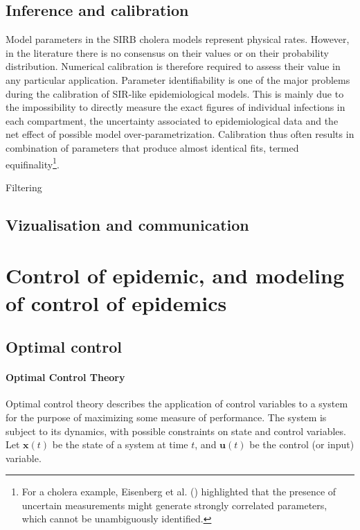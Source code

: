 \subsection{Inference and calibration} 
Model parameters in the SIRB cholera models represent physical rates. However, in the literature there is no consensus on their values or on their  probability distribution. Numerical calibration is therefore required to assess their value in any particular application. Parameter identifiability is one of the major problems during the calibration of SIR-like epidemiological models. This is mainly due to the impossibility to directly measure the exact figures of individual infections in each compartment, the uncertainty associated to epidemiological data and the net effect of possible model over-parametrization. Calibration thus often results in combination of parameters that produce almost identical fits, termed equifinality\footnote{For a cholera example, Eisenberg et al. () highlighted that the presence of uncertain measurements might generate strongly correlated parameters, which cannot be unambiguously  identified.}.



 Filtering
\subsection{Vizualisation and communication}


 \section{Control of epidemic, and modeling of control of epidemics}%

\subsection{Optimal control}
\paragraph{Optimal Control Theory}
Optimal control theory describes the application of control variables to a system for the purpose of maximizing some measure of performance. The system is subject to its dynamics, with possible constraints on state and control variables. Let $\textbf{x}(t)$ be the state of a system at time $t$, and $\textbf{u}(t)$ be the control (or input) variable. 

